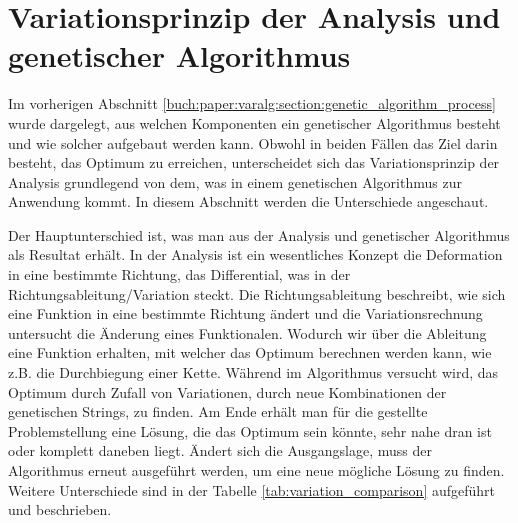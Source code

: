 %
%
%
%
\section{Variationsprinzip der Analysis und genetischer Algorithmus
  \label{buch:paper:varalg:section:variations_analysis_algorithm_result}}
Im vorherigen Abschnitt \ref{buch:paper:varalg:section:genetic_algorithm_process}
wurde dargelegt, aus welchen Komponenten ein genetischer Algorithmus besteht und wie 
solcher aufgebaut werden kann. 
Obwohl in beiden Fällen das Ziel darin besteht, das Optimum zu erreichen, unterscheidet
sich das Variationsprinzip der Analysis grundlegend von dem, was in einem genetischen 
Algorithmus zur Anwendung kommt. In diesem Abschnitt werden die Unterschiede angeschaut.

Der Hauptunterschied ist, was man aus der Analysis und genetischer Algorithmus 
als Resultat erhält. In der Analysis ist ein wesentliches Konzept die Deformation in eine bestimmte 
Richtung, das Differential, was in der Richtungsableitung/Variation steckt. Die Richtungsableitung 
beschreibt, wie sich eine Funktion in eine bestimmte Richtung ändert und die Variationsrechnung 
untersucht die Änderung eines Funktionalen. Wodurch wir über die Ableitung 
eine Funktion erhalten, mit welcher das Optimum berechnen werden kann, wie z.B. die  
Durchbiegung einer Kette. Während im Algorithmus versucht wird, das Optimum durch Zufall von   
Variationen, durch neue Kombinationen der genetischen Strings, zu finden. Am 
Ende erhält man für die gestellte Problemstellung eine Lösung, die das Optimum sein könnte,  
sehr nahe dran ist oder komplett daneben liegt. Ändert sich die Ausgangslage, muss der Algorithmus 
erneut ausgeführt werden, um eine neue mögliche Lösung zu finden. 
Weitere Unterschiede sind in der 
Tabelle \ref{tab:variation_comparison} aufgeführt und beschrieben.

